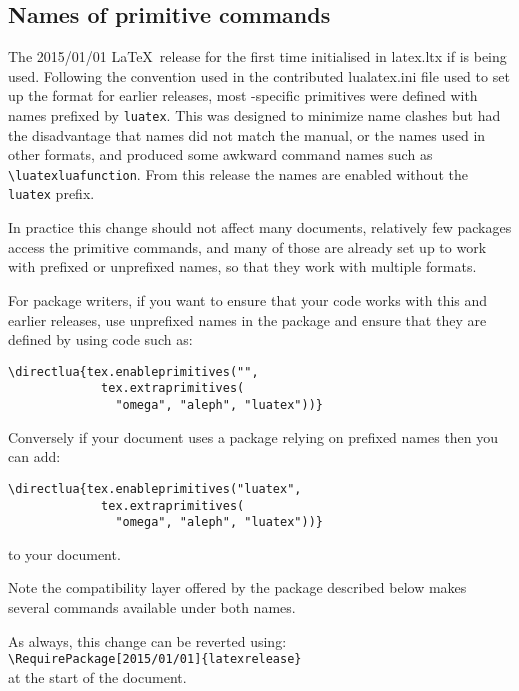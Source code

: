 \documentclass{ltnews}
\begin{document}
\subsection{Names of  primitive commands}

The 2015/01/01 \LaTeX\ release for the first time initialised
 in \textsf{latex.ltx} if  is being
used. Following the convention used in the contributed
\textsf{lualatex.ini} file used to set up the format for earlier
releases, most -specific primitives were defined with
names prefixed by \texttt{luatex}. This was designed to minimize name
clashes but had the disadvantage that names did not match the
 manual, or the names used in other formats, and
produced some awkward command names such as \verb|\luatexluafunction|.
From this release the names are enabled without the \texttt{luatex}
prefix.

In practice this change should not affect many documents, relatively
few packages access the primitive commands, and many of those are
already set up to work with prefixed or unprefixed names, so that they
work with multiple formats.

For package writers, if you want to ensure that your code works with
this and earlier releases, use unprefixed names in the package and
ensure that they are defined by using code such as:
\begin{verbatim}
\directlua{tex.enableprimitives("",
             tex.extraprimitives(
               "omega", "aleph", "luatex"))}
\end{verbatim}
Conversely if your document  uses a package relying on prefixed names
then you can add:
\begin{verbatim}
\directlua{tex.enableprimitives("luatex",
             tex.extraprimitives(
               "omega", "aleph", "luatex"))}
\end{verbatim}
to your document.

Note the compatibility layer offered by the  package
described below makes several commands available under both names.

As always, this change can be reverted using:\\
\verb|\RequirePackage[2015/01/01]{latexrelease}|\\
at the start of the document.
\end{document}
